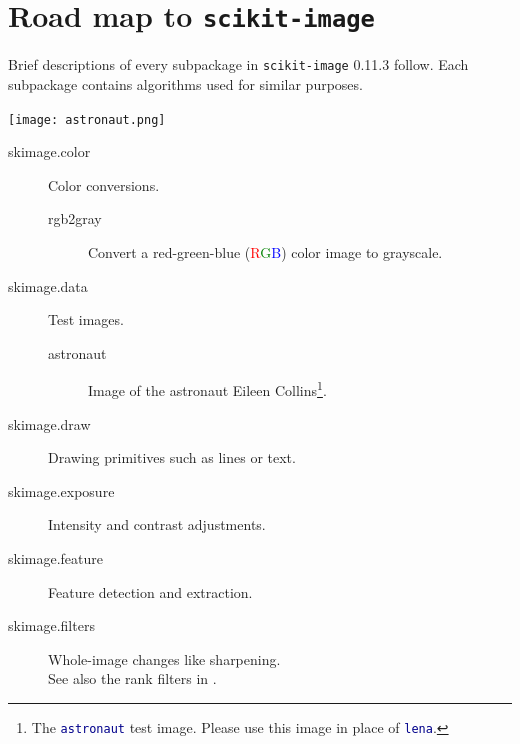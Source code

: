 \documentclass[nohyper, %
               ]{tufte-handout}
\newcommand{\release}{0.11.3\xspace} %
\DeclareRobustCommand{\ski}{\texttt{scikit-image}\xspace}
\newcommand{\rgb}{\textcolor{Red}{R}\textcolor{Green}{G}\textcolor{Blue}{B}}
\newcommand{\pyblue}[1]{\textcolor{DarkBlue}{\pyv{#1}}}
\begin{document}
\section{Road map to \ski} %
  \label{sec:road_map}
  Brief descriptions of every subpackage in \ski \release follow. Each subpackage contains algorithms used for similar purposes.%
  \begin{marginfigure}[0cm]%
    \texttt{[image: astronaut.png]}%
    \label{fig:astronaut}%
  \end{marginfigure}%
  \begin{description}%
    \item[skimage.color] Color conversions.
    \begin{description}
      \item[rgb2gray] Convert a red-green-blue (\rgb) color image to grayscale.
    \end{description}
    \item[skimage.data] Test images.
    \begin{description}
      \item[astronaut] Image of the astronaut Eileen Collins\footnote[2][0.3cm]{The \textcolor{DarkBlue}{\texttt{astronaut}} test image. Please use this image in place of \textcolor{DarkBlue}{\texttt{lena}}.}.
    \end{description}
    \item[skimage.draw] Drawing primitives such as lines or text.
    \item[skimage.exposure] Intensity and contrast adjustments.
    \item[skimage.feature] Feature detection and extraction.
    \item[skimage.filters] Whole-image changes like sharpening. \hfill \\See also the rank filters in .

\end{description}
\end{document}
